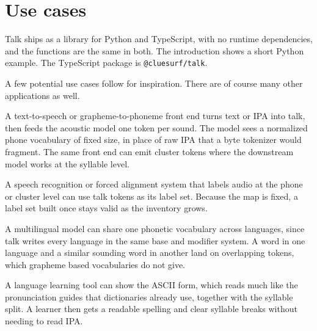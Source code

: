 \section{Use cases}

Talk ships as a library for Python and TypeScript, with no runtime dependencies, and the functions are the same in both. The introduction shows a short Python example. The TypeScript package is \verb|@cluesurf/talk|.

A few potential use cases follow for inspiration. There are of course many other applications as well.

A text-to-speech or grapheme-to-phoneme front end turns text or IPA into talk, then feeds the acoustic model one token per sound. The model sees a normalized phone vocabulary of fixed size, in place of raw IPA that a byte tokenizer would fragment. The same front end can emit cluster tokens where the downstream model works at the syllable level.

A speech recognition or forced alignment system that labels audio at the phone or cluster level can use talk tokens as its label set. Because the map is fixed, a label set built once stays valid as the inventory grows.

A multilingual model can share one phonetic vocabulary across languages, since talk writes every language in the same base and modifier system. A word in one language and a similar sounding word in another land on overlapping tokens, which grapheme based vocabularies do not give.

A language learning tool can show the ASCII form, which reads much like the pronunciation guides that dictionaries already use, together with the syllable split. A learner then gets a readable spelling and clear syllable breaks without needing to read IPA.
